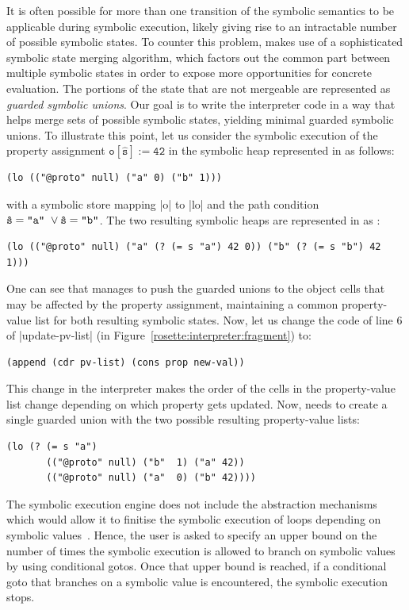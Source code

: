 It is often possible for more than one transition of the symbolic 
semantics to be applicable during symbolic execution, likely 
giving rise to an intractable number of possible symbolic states. 
To counter this problem, \rosette makes use of a sophisticated 
symbolic state merging algorithm, which factors out the common 
part between multiple symbolic states  in order to expose more 
opportunities for concrete evaluation. The portions of the state 
that are not mergeable are represented as \emph{guarded symbolic unions}. 
Our goal is to write the interpreter code in a way that helps 
\rosette merge sets of possible symbolic states, yielding minimal 
guarded symbolic unions.
To illustrate this point, let us consider the symbolic execution 
of the property assignment $\mathtt{o[\hat{s}] := 42}$ in the 
symbolic heap represented in \rosette as follows: 
%
\begin{lstlisting}
(lo (("@proto" null) ("a" 0) ("b" 1)))
\end{lstlisting}
%
with a symbolic store mapping \schemeinline|o| to \schemeinline|lo| and 
the path condition {\small $\mathtt{\hat{s} = \text{\texttt{"a"}} \ \vee \hat{s} = \text{\texttt{"b"}}}$}.
The two resulting symbolic heaps are represented in \rosette as :  
%
\begin{lstlisting}
(lo (("@proto" null) ("a" (? (= s "a") 42 0)) ("b" (? (= s "b") 42 1)))
\end{lstlisting}
%
One can see that \rosette manages to push the guarded unions to 
the object cells that may be affected by the property assignment, maintaining a common 
property-value list for both resulting symbolic states. 
%
Now, let us change the code of line 6 of \schemeinline|update-pv-list| 
(in Figure~\ref{rosette:interpreter:fragment}) to:  
\begin{lstlisting}
(append (cdr pv-list) (cons prop new-val))
\end{lstlisting}
This change in the interpreter makes the order of the cells in the property-value 
list change depending on which property gets updated. 
Now, \rosette needs to create a single guarded union 
with the two possible resulting property-value lists: 
\begin{lstlisting}
(lo (? (= s "a") 
       (("@proto" null) ("b"  1) ("a" 42)) 
       (("@proto" null) ("a"  0) ("b" 42))))
\end{lstlisting}

 The \jsil symbolic execution engine does not 
include the abstraction mechanisms which would allow it to finitise the symbolic 
execution of loops depending on symbolic values~\cite{abstract:symbolic:exec}. 
Hence, the user is asked to specify an upper bound on the number of times
the symbolic execution is allowed to branch on symbolic values by using
conditional gotos. 
Once that upper bound is reached, if a conditional goto that branches 
on a symbolic value is encountered, the symbolic execution stops.  

